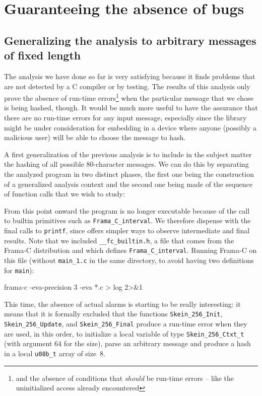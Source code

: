 \documentclass{frama-c-book}
\begin{document}
\section{Guaranteeing the absence of bugs}

\subsection{Generalizing the analysis to arbitrary messages of fixed length}

The analysis we have done so far is very satisfying because
it finds problems that are not detected by a C compiler or by testing.
The results of this analysis only prove
the absence of run-time errors\footnote{and the absence
of conditions that
{\em should} be run-time errors -- like the uninitialized access already
encountered} when the particular message that we
chose is being hashed, though.
It would be much more useful to have the assurance that there are
no run-time errors for any input message, especially since the library
might be under consideration for embedding in a device where anyone
(possibly a malicious user) will be able to choose the message
to hash.

A first generalization of the previous analysis  is to include
in the subject matter
the hashing of all possible 80-character messages. We can do this
by separating the analyzed program in two distinct phases, the first
one being the construction of a generalized analysis context
and the second one being made of the sequence of function calls
that we wish to study:


From this point onward the program is no longer executable because
of the call to builtin primitives such as \lstinline|Frama_C_interval|.
We therefore dispense with the final calls to \lstinline|printf|,
since \Eva{} offers simpler ways to observe intermediate
and final results. Note that we included \verb|__fc_builtin.h|, a file
that comes from the Frama-C distribution and which
defines \lstinline|Frama_C_interval|. Running Frama-C on this
file (without \verb|main_1.c| in the same directory, to avoid having two
definitions for \verb|main|):
\begin{frama-c-commands}
frama-c -eva-precision 3 -eva *.c > log 2>&1
\end{frama-c-commands}

This time, the absence of actual alarms is starting to be really interesting:
it means that it is formally excluded that the functions
\lstinline|Skein_256_Init|, \lstinline|Skein_256_Update|, and
\lstinline|Skein_256_Final| produce a run-time error when
they are used, in this order, to initialize a local variable
of type \lstinline|Skein_256_Ctxt_t| (with argument 64 for the size),
parse an arbitrary message and produce a hash in a local \lstinline|u08b_t|
array of size~8.
\end{document}
